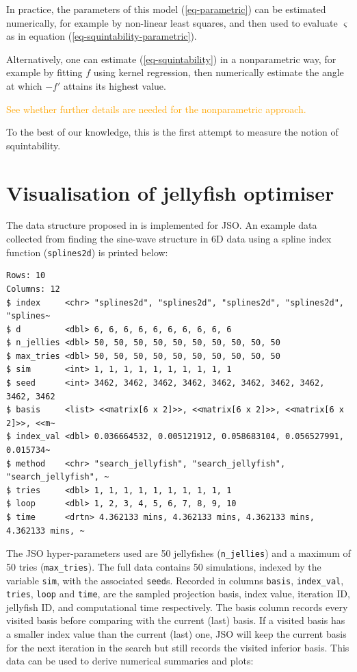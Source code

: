 \documentclass[
  number,
  preprint,
  3p]{elsarticle}
\begin{document}
In practice, the parameters of this model (\ref{eq-parametric}) can be
estimated numerically, for example by non-linear least squares, and then
used to evaluate \(\varsigma\) as in equation
(\ref{eq-squintability-parametric}).

Alternatively, one can estimate (\ref{eq-squintability}) in a
nonparametric way, for example by fitting \(f\) using kernel regression,
then numerically estimate the angle at which \(-f'\) attains its highest
value.

\textcolor{orange}{See whether further details are needed for the nonparametric approach.}

To the best of our knowledge, this is the first attempt to measure the
notion of squintability.

\section{Visualisation of jellyfish optimiser}\label{sec-vis}

The data structure proposed in \citet{RJ-2021-105} is implemented for
JSO. An example data collected from finding the sine-wave structure in
6D data using a spline index function (\texttt{splines2d}) is printed
below:

\begin{verbatim}
Rows: 10
Columns: 12
$ index     <chr> "splines2d", "splines2d", "splines2d", "splines2d", "splines~
$ d         <dbl> 6, 6, 6, 6, 6, 6, 6, 6, 6, 6
$ n_jellies <dbl> 50, 50, 50, 50, 50, 50, 50, 50, 50, 50
$ max_tries <dbl> 50, 50, 50, 50, 50, 50, 50, 50, 50, 50
$ sim       <int> 1, 1, 1, 1, 1, 1, 1, 1, 1, 1
$ seed      <int> 3462, 3462, 3462, 3462, 3462, 3462, 3462, 3462, 3462, 3462
$ basis     <list> <<matrix[6 x 2]>>, <<matrix[6 x 2]>>, <<matrix[6 x 2]>>, <<m~
$ index_val <dbl> 0.036664532, 0.005121912, 0.058683104, 0.056527991, 0.015734~
$ method    <chr> "search_jellyfish", "search_jellyfish", "search_jellyfish", ~
$ tries     <dbl> 1, 1, 1, 1, 1, 1, 1, 1, 1, 1
$ loop      <dbl> 1, 2, 3, 4, 5, 6, 7, 8, 9, 10
$ time      <drtn> 4.362133 mins, 4.362133 mins, 4.362133 mins, 4.362133 mins, ~
\end{verbatim}

The JSO hyper-parameters used are 50 jellyfishes (\texttt{n\_jellies})
and a maximum of 50 tries (\texttt{max\_tries}). The full data contains
50 simulations, indexed by the variable \texttt{sim}, with the
associated \texttt{seed}s. Recorded in columns \texttt{basis},
\texttt{index\_val}, \texttt{tries}, \texttt{loop} and \texttt{time},
are the sampled projection basis, index value, iteration ID, jellyfish
ID, and computational time respectively. The basis column records every
visited basis before comparing with the current (last) basis. If a
visited basis has a smaller index value than the current (last) one, JSO
will keep the current basis for the next iteration in the search but
still records the visited inferior basis. This data can be used to
derive numerical summaries and plots:
\end{document}
